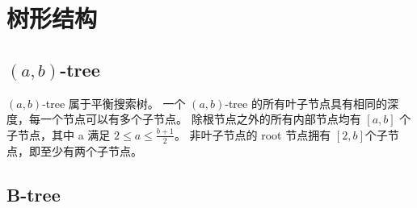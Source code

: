 \section{树形结构}
\subsection{$(a,b)$-tree}
$(a,b)$-tree 属于平衡搜索树。
一个 $(a,b)$-tree 的所有叶子节点具有相同的深度，每一个节点可以有多个子节点。
除根节点之外的所有内部节点均有 $[a,b]$ 个子节点，其中 a 满足 $2 \le a \le \frac{b+1}{2}$。
非叶子节点的 root 节点拥有 $[2,b]$个子节点，即至少有两个子节点。
\subsection{B-tree}
